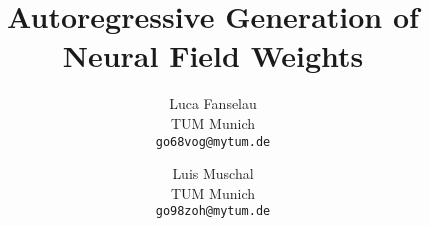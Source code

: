 \documentclass[10pt,twocolumn,letterpaper]{article}
\title{Autoregressive Generation of Neural Field Weights}
\author{Luca Fanselau\\
TUM Munich\\
{\tt\small go68vog@mytum.de}
\and
Luis Muschal\\
TUM Munich\\
{\tt\small go98zoh@mytum.de}
}
\begin{document}
\maketitle









{
    \small
    
    
}

% 
\end{document}
